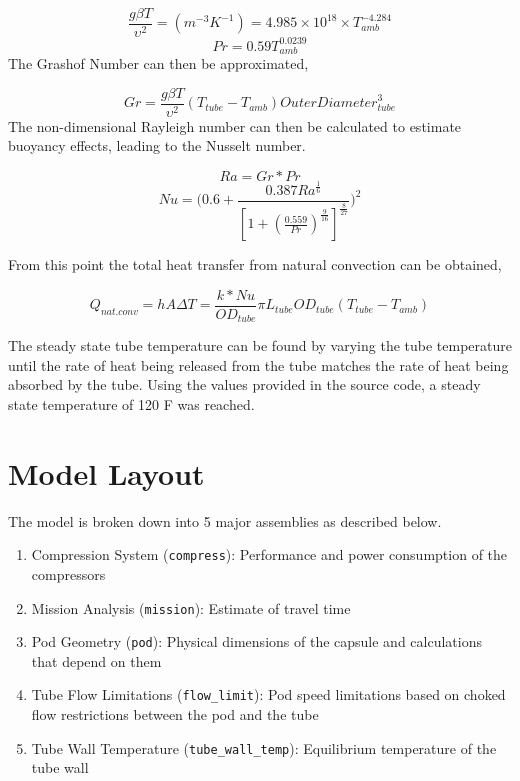 \documentclass[heading.tex]{subfiles}
\begin{document}
\begin{equation*}
\frac{g \beta T} {\upsilon^2}  = (m^{-3}K^{-1}) = 4.985\times10^{18} \times T_{amb}^{-4.284}
\end{equation*}
\begin{equation*}
Pr = 0.59 T_{amb}^{0.0239}
\end{equation*}
The Grashof Number can then be approximated,


\begin{equation*}
Gr = \frac{g \beta T} {\upsilon^2}  (T_{tube}-T_{amb}) {OuterDiameter}_{tube}^3
\end{equation*}
The non-dimensional Rayleigh number can then be calculated to estimate buoyancy effects, leading to the Nusselt number.


\begin{equation*}
Ra = Gr * Pr
\end{equation*}
\begin{equation*}
Nu = \Bigg(0.6 + \frac{0.387Ra^{\frac{1}{6}}}{[1+(\frac{0.559}{Pr})^{\frac{9}{16}}]^{\frac{8}{27}}}\Bigg)^2
\end{equation*}

From this point the total heat transfer from natural convection can be obtained,

\begin{equation*}
Q_{nat. conv} = hA \Delta T = \frac{k*Nu}{ {OD}_{tube}} \pi {L}_{tube} {OD}_{tube} (T_{tube}-T_{amb})
\end{equation*}

The steady state tube temperature can be found by varying the tube temperature until the rate of heat being released from the tube
matches the rate of heat being absorbed by the tube. Using the values provided in the source code, a steady state temperature of 120 F
was reached.


\section{Model Layout}
The model is broken down into 5 major assemblies as described below. 

\begin{enumerate}
  \item Compression System (\texttt{compress}): Performance and power consumption of the compressors
  \item Mission Analysis (\texttt{mission}): Estimate of travel time
  \item Pod Geometry (\texttt{pod}): Physical dimensions of the capsule and calculations that depend on them
  \item Tube Flow Limitations (\texttt{flow\_limit}): Pod speed limitations based on choked flow restrictions between the pod and the tube
  \item Tube Wall Temperature (\texttt{tube\_wall\_temp}): Equilibrium temperature of the tube wall
\end{enumerate}
\end{document}

